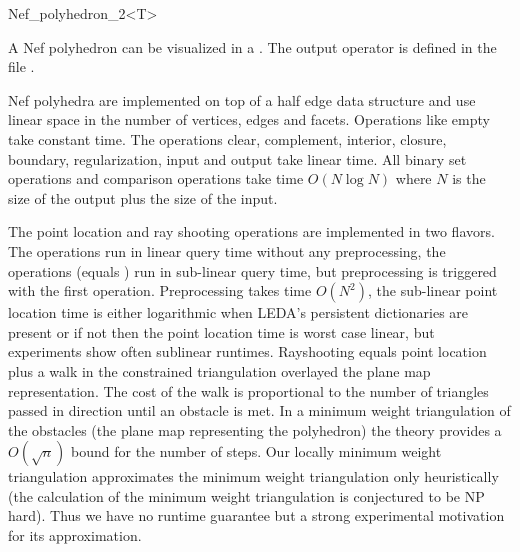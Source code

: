 \begin{ccRefClass}{Nef_polyhedron_2<T>}


A Nef polyhedron  can be visualized in a . The 
output operator is defined in the file 
.
 



\ccImplementation

Nef polyhedra are implemented on top of a half edge
data structure and use linear space in the number of vertices, edges
and facets.  Operations like empty take constant time. The
operations clear, complement, interior, closure, boundary,
regularization, input and output take linear time. All binary set
operations and comparison operations take time $O(N \log N)$ where $N$
is the size of the output plus the size of the input.

The point location and ray shooting operations are implemented in
two flavors. The  operations run in linear query time without
any preprocessing, the  operations (equals ) run in
sub-linear query time, but preprocessing is triggered with the first
operation. Preprocessing takes time $O(N^2)$, the sub-linear point
location time is either logarithmic when LEDA's persistent
dictionaries are present or if not then the point location time is
worst case linear, but experiments show often sublinear runtimes.
Rayshooting equals point location plus a walk in the constrained
triangulation overlayed the plane map representation. The cost of the
walk is proportional to the number of triangles passed in direction
 until an obstacle is met. In a minimum weight triangulation of the
obstacles (the plane map representing the polyhedron) the theory
provides a $O(\sqrt{n})$ bound for the number of steps. Our locally
minimum weight triangulation approximates the minimum weight
triangulation only heuristically (the calculation of the minimum
weight triangulation is conjectured to be NP hard). Thus we have no
runtime guarantee but a strong experimental motivation for its
approximation. 




\end{ccRefClass}
